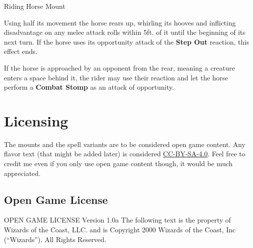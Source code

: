 \documentclass[letterpaper,twocolumn,openany,nodeprecatedcode]{dndbook}
\begin{document}
\begin{DndMonster}[float*=b,width=\textwidth + 8pt]{Riding Horse Mount}
\begin{multicols}{2}
    Using half its movement the horse rears up, whirling its hooves and inflicting disadvantage on any melee attack rolls within 5ft. of it until the beginning of its next turn. If the horse uses its opportunity attack of the \textbf{Step Out} reaction, this effect ends.


    If the horse is approached by an opponent from the rear, meaning a creature enters a space behind it, the rider may use their reaction and let the horse perform a \textbf{Combat Stomp} as an attack of opportunity.

  \end{multicols}
\end{DndMonster}

\chapter{Licensing}

The mounts and the spell variants are to be considered open game content. Any flavor text (that might be added later) is considered \href{https://creativecommons.org/licenses/by-sa/4.0/legalcode}{CC-BY-SA-4.0}. Feel free to credit me even if you only use open game content though, it would be much appreciated.

\section{Open Game License}

OPEN GAME LICENSE Version 1.0a The following text is the property of Wizards of the Coast, LLC. and is Copyright 2000 Wizards of the Coast, Inc (“Wizards”). All Rights Reserved.
\end{document}
